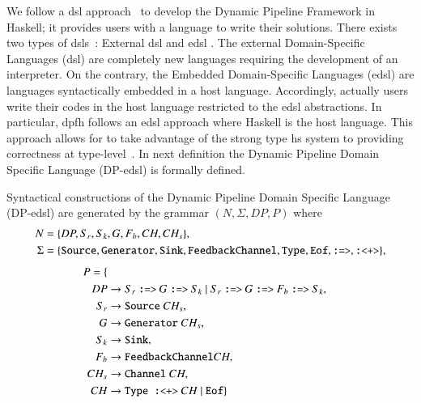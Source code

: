 \fi
%
We follow a \acrfull{dsl} approach~\cite{Fowler10} to develop the Dynamic Pipeline Framework in Haskell; it  provides users with a language to write their solutions. There exists two types of \acrlong{dsl}s~\cite{dsl}: External \acrfull{dsl} and \acrfull{edsl} \cite{dsel}. The external Domain-Specific Languages (\acrshort{dsl})  are completely new languages requiring the development of an interpreter. On the contrary, the Embedded Domain-Specific Languages (\acrshort{edsl}) are languages syntactically embedded in a host language.
Accordingly, actually users write their codes in the host language restricted to the \acrshort{edsl} abstractions. In particular, \acrshort{dpfh} follows an \acrshort{edsl} approach where Haskell is the host language. This approach allows for to take  advantage of the strong type \acrshort{hs}  system to providing correctness at type-level~\cite{curryhoward}. In next definition the Dynamic Pipeline Domain Specific Language (DP-\acrshort{edsl}) is  formally defined.

\begin{definition}\label{def:cfg:dsl}
Syntactical constructions of the Dynamic Pipeline Domain Specific Language (DP-\acrshort{edsl}) are generated by  the grammar $(N, \Sigma, DP, P)$ where
\begin{equation*}\label{grammar:eq}
      \begin{aligned}
    N &= \{DP,S_r,S_k,G,F_b,CH,CH_s\},\\
    \Sigma &= \{\text{\texttt{Source}},\text{\texttt{Generator}},\text{\texttt{Sink}},\text{\texttt{FeedbackChannel}},\text{\texttt{Type}},\text{\texttt{Eof}},\text{\texttt{:=>}},\text{\texttt{:<+>}}\},
    \end{aligned}
\end{equation*}
\begin{equation*}
    \begin{aligned}
  P = \{\\
  DP  &\rightarrow S_r\ \text{\texttt{:=>}}\ G\ \text{\texttt{:=>}}\ S_k\ |\ S_r\ \text{\texttt{:=>}}\ G\ \text{\texttt{:=>}}\ F_b\ \text{\texttt{:=>}}\ S_k,\\
  S_r &\rightarrow \text{\texttt{Source}}\ CH_s,\\
  G   &\rightarrow \text{\texttt{Generator}}\ CH_s,\\
  S_k &\rightarrow \text{\texttt{Sink}},\\
  F_b &\rightarrow \text{\texttt{FeedbackChannel}} CH,\\
  CH_s &\rightarrow \text{\texttt{Channel}}\ CH,\\
  CH &\rightarrow \text{\texttt{Type :<+>}}\ CH\ |\ \text{\texttt{Eof}}\}
\end{aligned}
\end{equation*}
\end{definition}

